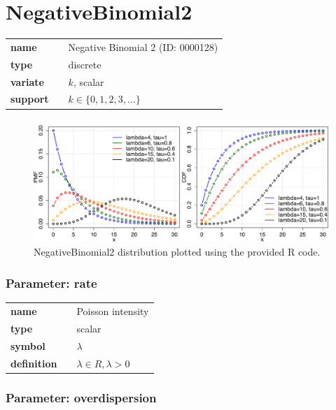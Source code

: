 \section*{NegativeBinomial2} 

  \bigskip 

\begin{tabular}{p{2cm}cl}
\textbf{name} & & Negative Binomial 2 (ID: 0000128)\\ 
 
\textbf{type} & & discrete \\ 

\textbf{variate} & & $k$, scalar \\ 

\textbf{support} & & $k \in \{0,1,2,3,\dots\}$
\end{tabular}

\begin{figure}[ht!]
\centering
  \includegraphics[width=140mm]{pics/NegativeBinomial2.pdf}
 \caption{NegativeBinomial2 distribution plotted using the provided R code.}
 \label{fig:NegativeBinomial2}
\end{figure}

\subsubsection*{Parameter: rate}

\noindent\begin{tabular}{p{2cm}cl}
\textbf{name} & & Poisson intensity \\
\textbf{type} & & scalar \\
\textbf{symbol} & & $\lambda$  \\
\textbf{definition} & & $\lambda \in R, \lambda > 0$
\end{tabular}
\subsubsection*{Parameter: overdispersion}

